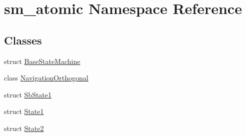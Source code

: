 \hypertarget{namespacesm__atomic}{}\section{sm\+\_\+atomic Namespace Reference}
\label{namespacesm__atomic}
\subsection*{Classes}
\begin{DoxyCompactItemize}
\item 
struct \hyperlink{structsm__atomic_1_1BaseStateMachine}{Base\+State\+Machine}
\item 
class \hyperlink{classsm__atomic_1_1NavigationOrthogonal}{Navigation\+Orthogonal}
\item 
struct \hyperlink{structsm__atomic_1_1SbState1}{Sb\+State1}
\item 
struct \hyperlink{structsm__atomic_1_1State1}{State1}
\item 
struct \hyperlink{structsm__atomic_1_1State2}{State2}
\end{DoxyCompactItemize}
